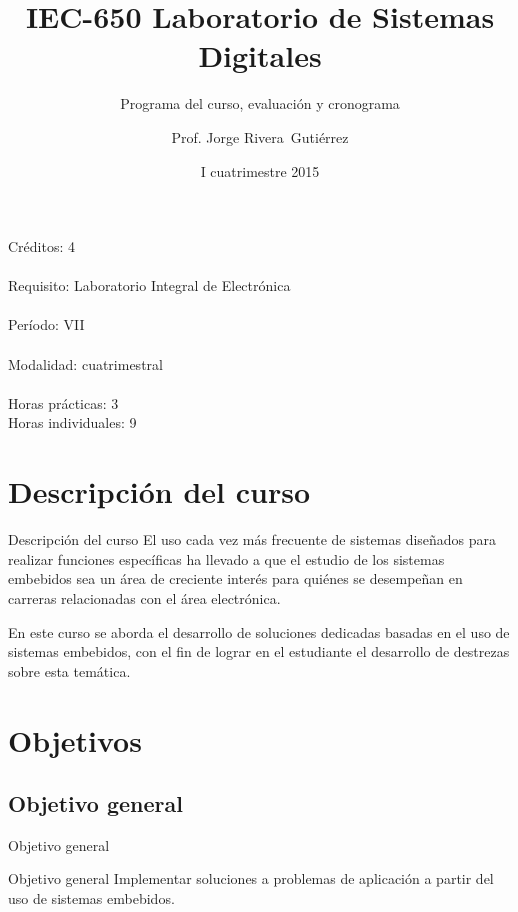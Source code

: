 \documentclass[handout,xcolor=dvipsnames]{beamer}
\title[IEC-650]{IEC-650 Laboratorio de Sistemas Digitales}
\subtitle{Programa del curso, evaluación y cronograma}
\author{Prof. Jorge Rivera~Guti\'errez}
\institute{Universidad Latina de Costa Rica\\ Ingenier\'\i a en Electr\'onica}
\date{I cuatrimestre 2015}
\newcommand{\pageframe}[1]{\frame{\begin{center}{ \Huge #1 }\end{center}}}
\begin{document}
\begin{frame}
 \maketitle
\end{frame}

\begin{frame}
 \begin{center}
  \Large Créditos: 4\\~\\
  Requisito: Laboratorio Integral de Electr\'onica\\~\\
  Período: VII\\~\\
  Modalidad: cuatrimestral\\~\\
  Horas pr\'acticas: 3\\
  Horas individuales: 9
 \end{center}
\end{frame}

\section{Descripción del curso}

\begin{frame}{Descripción del curso}
 El uso cada vez más frecuente de sistemas diseñados para realizar funciones específicas ha llevado a que el estudio de los sistemas embebidos sea un área de creciente interés para quiénes se desempeñan en carreras relacionadas con el área electrónica.

 En este curso se aborda el desarrollo de soluciones dedicadas basadas en el uso de sistemas embebidos, con el fin de lograr en el estudiante el desarrollo de destrezas sobre esta temática.
\end{frame}

\section{Objetivos}

\pageframe{Objetivos}

\subsection{Objetivo general}

\begin{frame}{Objetivo general}
  \begin{block}{Objetivo general}
    Implementar soluciones a problemas de aplicación a partir del uso de sistemas embebidos.
  \end{block}
\end{frame}
\end{document}
